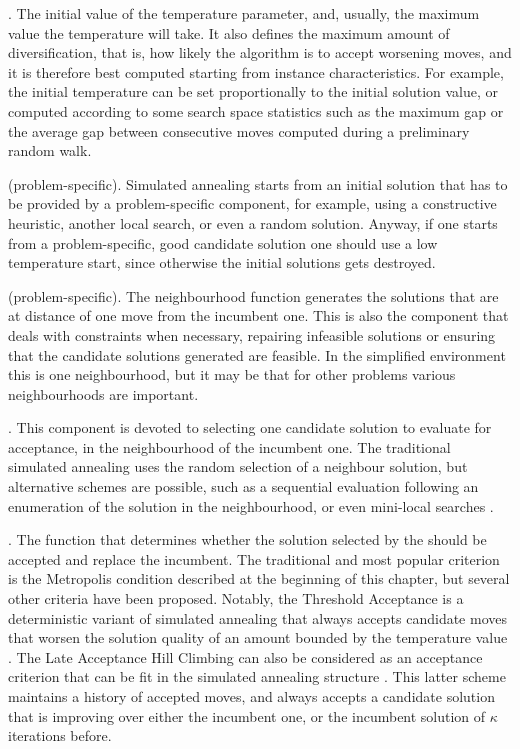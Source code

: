{\initialtemperature.}
The initial value of the temperature parameter, and, usually, the
maximum value the temperature will take. It also defines the maximum amount of 
diversification, that is, how likely the algorithm is to accept worsening moves,
and it is therefore best computed starting from instance characteristics. 
For example, the initial temperature can be set proportionally to the initial solution value, 
or computed according to some search space statistics such as the maximum gap 
or the average gap between consecutive moves computed during a preliminary random walk.

{\initialsolution (problem-specific).}
Simulated annealing starts from an initial solution that has to be provided 
by a problem-specific component, for example, using a
constructive heuristic, another local search, or even a
random solution. Anyway, if one starts from a problem-specific, 
good candidate solution one should use a low temperature start, since 
otherwise the initial solutions gets destroyed. 

{\neighbourhood (problem-specific).}
The neighbourhood function generates the solutions that are at
distance of one move from the incumbent one. This is also the
component that deals with constraints when necessary, repairing 
infeasible solutions or ensuring that the candidate solutions
generated are feasible. In the simplified environment this is one 
neighbourhood, but it may be that for other problems various 
neighbourhoods are important. 

{\explorationcriterion.}
This component is devoted to selecting one candidate solution to evaluate for acceptance, in the neighbourhood
of the incumbent one. The traditional simulated annealing uses the random selection of a neighbour solution, but alternative
schemes are possible, such as a sequential evaluation following an enumeration
of the solution in the neighbourhood, or even mini-local searches \cite{COnnolly1990,IshMisTan1995}.

{\acceptancecriterion.} 
The function that determines whether the solution selected by the 
\explorationcriterion should be accepted and replace the incumbent.
The traditional and most popular criterion is the Metropolis condition described at the beginning of this chapter,
but several other criteria have been proposed.
Notably, the Threshold Acceptance is a deterministic variant of simulated annealing 
that always accepts candidate moves that worsen the solution quality of an amount bounded by the temperature value
\cite{DueSch90,MosFon1990}. The Late Acceptance Hill Climbing can also 
be considered as an acceptance criterion that can be fit in the simulated annealing 
structure \cite{BurByk2017}. This latter scheme maintains a history of accepted moves,
and always accepts a candidate solution that is improving over either
the incumbent one, or the incumbent solution of $\kappa$ iterations before.

